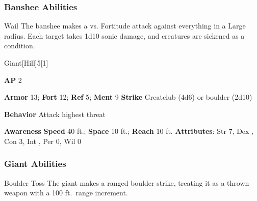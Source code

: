 \subsubsection{Banshee Abilities}

\begin{ability}{Wail}
The banshee makes a  vs. Fortitude attack against everything in a Large radius.
\hit Each target takes 1d10 sonic damage, and creatures are sickened as a condition.
\end{ability}

\begin{monsection}{Giant}[Hill]{5}[1]
\vspace{-1em}\vspace{-1em}
\begin{spellcontent}
\begin{spelltargetinginfo}
{\textbf{AP} 2}

\pari \textbf{Armor} 13;
\textbf{Fort} 12;
\textbf{Ref} 5;
\textbf{Ment} 9
\pari \textbf{Strike} Greatclub  (4d6) or boulder  (2d10)



\pari \textbf{Behavior} Attack highest threat
\end{spelltargetinginfo}
\end{spellcontent}

\begin{monsterfooter}
\pari \textbf{Awareness} 
\pari \textbf{Speed} 40 ft.;
\textbf{Space} 10 ft.;
\textbf{Reach} 10 ft.
\pari \textbf{Attributes}:
Str 7,
Dex ,
Con 3,
Int ,
Per 0,
Wil 0
\end{monsterfooter}
\end{monsection}


\subsubsection{Giant Abilities}

\begin{ability}{Boulder Toss}
The giant makes a ranged boulder strike, treating it as a thrown weapon with a 100 ft.\ range increment.
\end{ability}

